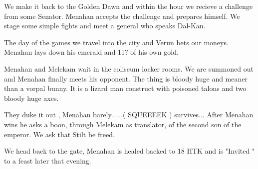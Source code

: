 \documentclass[10pt]{report}
\begin{document}
We make it back to the Golden Dawn and within the hour we recieve a
challenge from some Senator. Menahan accepts the challenge and prepares
himself. We stage some simple fights and meet a general who speaks
Dal-Kan.

The day of the games we travel into the city and Verun bets our
moneys. Menahan lays down his emerald and 11? of his own gold.

Menahan and Melekam wait in the coliseum locker rooms. We are summoned
out and Menahan finally meets his opponent. The thing is bloody huge and
meaner than a vorpal bunny. It is a lizard man construct with poisoned
talons and two bloody huge axes.

They duke it out , Menahan barely......( SQUEEEEK ) survives...
After Menahan wins he asks a boon, through Melekam as translator, of the
second son of the emperor. We ask that Stilt be freed.

We head back to the gate, Menahan is healed backed to 18 HTK and is
"Invited " to a feast later that evening.
\end{document}
